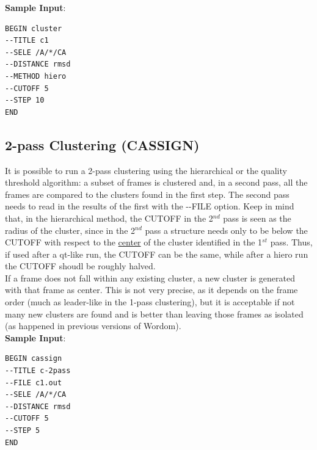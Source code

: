 \documentclass[11pt,twoside,onecolumn,a4paper,openright,notitlepage]{book}[2001/04/21]
\begin{document}
\textbf{\large Sample Input}:
\begin{verbatim}
BEGIN cluster
--TITLE c1
--SELE /A/*/CA
--DISTANCE rmsd
--METHOD hiero
--CUTOFF 5
--STEP 10
END
\end{verbatim}

\subsection{2-pass Clustering (CASSIGN)}
It is possible to run a 2-pass clustering using the hierarchical or the quality threshold algorithm: a subset of frames is clustered and, in a second pass, all the frames are compared to the clusters found in the first step. The second pass needs to read in the results of the first with the -{}-FILE option. Keep in mind that, in the hierarchical method, the CUTOFF in the 2$^{nd}$ pass is seen as the radius of the cluster, since in the 2$^{nd}$ pass a structure needs only to be below the CUTOFF with respect to the \underline{center} of the cluster identified in the 1$^{st}$ pass. Thus, if used after a qt-like run, the CUTOFF can be the same, while after a hiero run the CUTOFF shoudl be roughly halved.\\
If a frame does not fall within any existing cluster, a new cluster is generated with that frame as center. This is not very precise, as it depends on the frame order (much as leader-like in the 1-pass clustering), but it is acceptable if not many new clusters are found and is better than leaving those frames as isolated (as happened in previous versions of Wordom).\\

\textbf{\large Sample Input}:
\begin{verbatim}
BEGIN cassign
--TITLE c-2pass
--FILE c1.out
--SELE /A/*/CA
--DISTANCE rmsd
--CUTOFF 5
--STEP 5
END
\end{verbatim}
\end{document}
